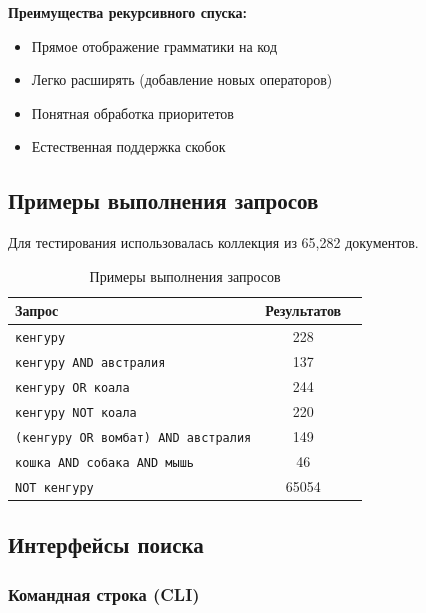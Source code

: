 \documentclass[a4paper,12pt]{article}
\begin{document}
\textbf{Преимущества рекурсивного спуска:}
\begin{itemize}
    \item Прямое отображение грамматики на код
    \item Легко расширять (добавление новых операторов)
    \item Понятная обработка приоритетов
    \item Естественная поддержка скобок
\end{itemize}

\subsection{Примеры выполнения запросов}

Для тестирования использовалась коллекция из 65,282 документов.

\begin{table}[H]
\centering
\begin{tabular}{|l|c|l|}
\hline
\textbf{Запрос} & \textbf{Результатов} \\
\hline
\texttt{кенгуру} & 228 \\
\hline
\texttt{кенгуру AND австралия} & 137 \\
\hline
\texttt{кенгуру OR коала} & 244 \\
\hline
\texttt{кенгуру NOT коала} & 220 \\
\hline
\texttt{(кенгуру OR вомбат) AND австралия} & 149 \\
\hline
\texttt{кошка AND собака AND мышь} & 46 \\
\hline
\texttt{NOT кенгуру} & 65054 \\
\hline
\end{tabular}
\caption{Примеры выполнения запросов}
\end{table}

\subsection{Интерфейсы поиска}

\subsubsection{Командная строка (CLI)}
\end{document}
